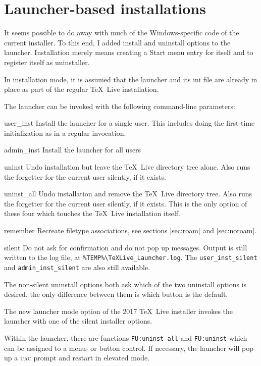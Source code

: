 \documentclass[11pt,a4paper,oneside]{report}
\def\TL{\TeX~Live}
\def\dbr{\discretionary{}{}{}}
\let\bsl\textbackslash
\def\bslb{\bsl\discretionary{}{}{}}
\newenvironment{ttdesc}{%
  \def\descriptionlabel##1{\hspace\labelsep\ttfamily\selectfont ##1}%
  \description}{\enddescription}
\begin{document}
\section{Launcher-based installations}
\label{sec:lbased}

It seems possible to do away with much of the Windows-specific code
of the current installer. To this end, I added install and uninstall
options to the launcher. Installation merely means creating a Start
menu entry for itself and to register itself as uninstaller.

In installation mode, it is assumed that the launcher and its ini
file are already in place as part of the regular \TL{}
installation.

The launcher can be invoked with the following command-line
parameters:

\begin{ttdesc}
\item[user\_inst] Install the launcher for a single user. This
  includes doing the first-time initialization as in a regular
  invocation.
\item[admin\_inst] Install the launcher for all users
\item[uninst] Undo installation but leave the \TL{}
  directory tree alone. Also runs the forgetter for the current
  user silently, if it exists.
\item[uninst\_all] Undo installation and remove the \TL{} directory
  tree. Also runs the forgetter for the current user silently, if it
  exists. This is the only option of these four which touches the
  \TL{} installation itself.
\item[remember] Recreate filetype associations, see sections
  \ref{sec:roam} and \ref{sec:noroam}.
\item[silent] Do not ask for confirmation and do not pop up
  messages. Output is still written to the log file, at
  \texttt{\%TEMP\%\bslb TeXLive\_\dbr Launcher.\dbr log}.
\end{ttdesc}
The \texttt{user\_inst\_silent} and \texttt{admin\_inst\_silent} are
also still available.

The non-silent uninstall options both ask which of the two uninstall
options is desired. the only difference between them is which button
is the default.

The new launcher mode option of the 2017 \TL{} installer invokes the
launcher with one of the silent installer options.

Within the launcher, there are functions \texttt{FU:uninst\_all} and
\texttt{FU:uninst} which can be assigned to a menu- or button
control. If necessary, the launcher will pop up a \textsc{uac}
prompt and restart in elevated mode.
\end{document}
